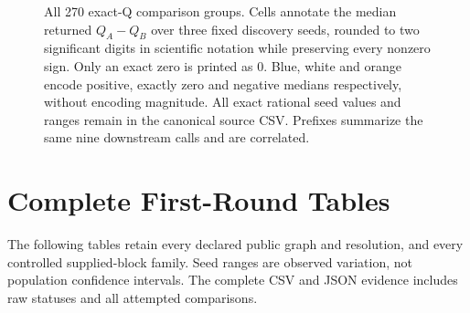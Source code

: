 \documentclass[sigconf,anonymous,review]{acmart}
\newcommand{\1}{\mathbf{1}}
\begin{document}
\begin{figure}[t]
\endgroup
\caption{All 270 exact-Q comparison groups. Cells annotate the median returned $Q_A-Q_B$ over three fixed discovery seeds, rounded to two significant digits in scientific notation while preserving every nonzero sign. Only an exact zero is printed as 0. Blue, white and orange encode positive, exactly zero and negative medians respectively, without encoding magnitude. All exact rational seed values and ranges remain in the canonical source CSV. Prefixes summarize the same nine downstream calls and are correlated.}\label{fig:v2-quality}
\end{figure}

\section{Complete First-Round Tables}\label{app:v1-tables}
The following tables retain every declared public graph and resolution, and every controlled supplied-block family. Seed ranges are observed variation, not population confidence intervals. The complete CSV and JSON evidence includes raw statuses and all attempted comparisons.
\end{document}
